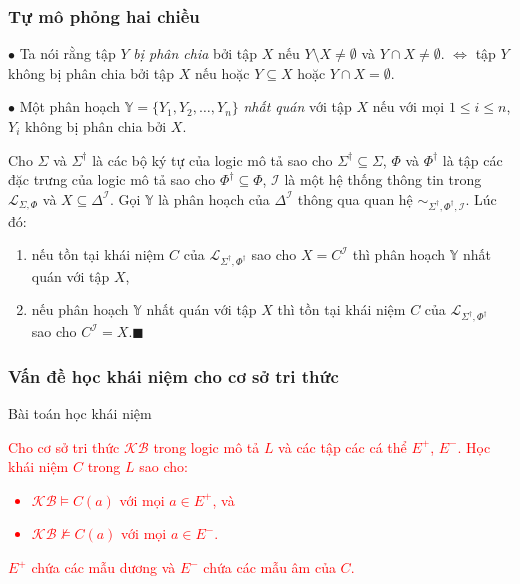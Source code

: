 \documentclass[fleqn]{beamer}
\newcommand{\mL}		{\mathcal{L}}
\newcommand{\mI}		{\mathcal{I}}
\newcommand{\mbY}		{\mathbb{Y}}
\newcommand{\SigmaDag}	{\Sigma^\dag}
\newcommand{\KB}		{\mathcal{KB}}
\newcommand{\mLSP}		{\mL_{\Sigma,\Phi}}
\newcommand{\mLSPD}		{\mL_{\Sigma^\dag,\Phi^\dag}}
\newcommand{\SdPdI}		{{\SigmaDag,\Phi^\dag,\mI}}
\newcommand{\myend}		{\mbox{}\hfill\mbox{{\tiny$\!\blacksquare$}}}
\begin{document}
\begin{frame}\frametitle{\textbf{Tự mô phỏng hai chiều}}
	$\bullet$ Ta nói rằng tập $Y$ {\em bị phân chia} bởi tập $X$ nếu $Y \setminus X \neq \emptyset$ và $Y \cap X \neq \emptyset$. $\Leftrightarrow$ tập $Y$ không bị phân chia bởi tập $X$ nếu hoặc $Y \subseteq X$ hoặc $Y \cap X = \emptyset$.
	\vspace{2.0ex}
	
	$\bullet$ Một phân hoạch $\mbY = \{Y_1, Y_2, \ldots, Y_n\}$ {\em nhất quán} với tập $X$ nếu với mọi $1 \leq i \leq n$, $Y_i$ không bị phân chia bởi $X$.
	
	\begin{theorem}
		\label{th:HGSDK}
		Cho $\Sigma$ và $\SigmaDag$ là các bộ ký tự của logic mô tả sao cho $\SigmaDag \subseteq \Sigma$, $\Phi$ và $\Phi^\dag$ là tập các đặc trưng của logic mô tả sao cho $\Phi^\dag \subseteq \Phi$, $\mI$ là một hệ thống thông tin trong $\mLSP$ và $X \subseteq \Delta^\mI$. Gọi $\mbY$ là phân hoạch của $\Delta^\mI$ thông qua quan hệ $\sim_\SdPdI$. Lúc đó:
		\begin{enumerate}
			\item nếu tồn tại khái niệm $C$ của $\mLSPD$ sao cho $X = C^\mI$ thì phân hoạch $\mbY$ nhất quán với tập $X$,
			
			\item nếu phân hoạch $\mbY$ nhất quán với tập $X$ thì tồn tại khái niệm $C$ của $\mLSPD$ sao cho $C^\mI = X$.\myend
		\end{enumerate}
	\end{theorem}
\end{frame}
\begin{frame}\frametitle{\bf Vấn đề học khái niệm cho cơ sở tri thức}
\begin{block}{Bài toán học khái niệm}
\textcolor{red}{
	Cho cơ sở tri thức $\KB$ trong logic mô tả $L$ và các tập các cá thể $E^+$, $E^-$. Học khái niệm $C$ trong $L$ sao cho:
	\vspace{1.0ex}
	\begin{itemize}
		\item \textcolor{red}{$\KB \models C(a)$ với mọi $a \in E^+$, và}
		\vspace{1.0ex}
		\item \textcolor{red}{$\KB \not\models C(a)$ với mọi $a \in E^-$.}
	\end{itemize}
	\vspace{1.0ex}
	$E^+$ chứa các mẫu dương và $E^-$ chứa các mẫu âm của $C$.
	\vspace{1.0ex}
}
\end{block}
\end{frame}
\end{document}
